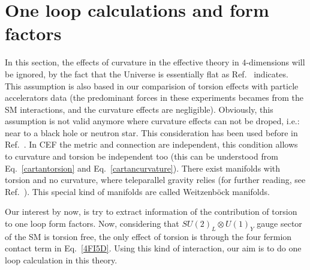 
\section{One loop calculations and form factors}
\label{sec:oneloop}

In this section, the effects of curvature in the effective theory in $4$-dimensions will be ignored, by the fact that the Universe is essentially flat as Ref.~\cite{Larson:2010gs} indicates. This assumption is also based in our comparision of torsion effects with particle accelerators data (the predominant forces in these experiments becames from the SM interactions, and the curvature effects are negligible). Obviously, this assumption is not valid anymore where curvature effects can not be droped, i.e.: near to a black hole or neutron star. This consideration has been used before in Ref.~\cite{Carroll:1994dq,Belyaev:1998ax,Kostelecky:2007kx}. In CEF the metric and connection are independent, this condition allows to curvature and torsion be independent too (this can be understood from Eq.~\eqref{cartantorsion} and Eq.~\eqref{cartancurvature}). There exist manifolds with torsion and no curvature, where teleparallel gravity relies (for further reading, see Ref.~\cite{Arcos:2005ec}). This special kind of manifolds are called Weitzenb\"ock manifolds.

Our interest by now, is try to extract information of the contribution of torsion to one loop form factors. Now, considering that $SU(2)_L\otimes U(1)_Y$ gauge sector of the SM is torsion free, the only effect of torsion is through the four fermion contact term in Eq.~\eqref{4FI5D}. Using this kind of interaction, our aim is to do one loop calculation in this theory. 

